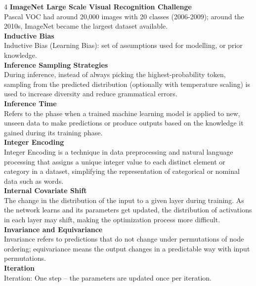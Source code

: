 \documentclass[8pt]{extarticle}
\begin{document}
\begin{multicols}{4}
\vspace{2pt}\textbf{ImageNet Large Scale Visual Recognition Challenge}\\
Pascal VOC had around 20,000 images with 20 classes (2006-2009); around the 2010s, ImageNet became the largest dataset available.\\
\vspace{2pt}\textbf{Inductive Bias}\\
Inductive Bias (Learning Bias): set of assumptions used for modelling, or prior knowledge.\\
\vspace{2pt}\textbf{Inference Sampling Strategies}\\
During inference, instead of always picking the highest-probability token, sampling from the predicted distribution (optionally with temperature scaling) is used to increase diversity and reduce grammatical errors.\\
\vspace{2pt}\textbf{Inference Time}\\
Refers to the phase when a trained machine learning model is applied to new, unseen data to make predictions or produce outputs based on the knowledge it gained during its training phase.\\
\vspace{2pt}\textbf{Integer Encoding}\\
Integer Encoding is a technique in data preprocessing and natural language processing that assigns a unique integer value to each distinct element or category in a dataset, simplifying the representation of categorical or nominal data such as words.\\
\vspace{2pt}\textbf{Internal Covariate Shift}\\
The change in the distribution of the input to a given layer during training. As the network learns and its parameters get updated, the distribution of activations in each layer may shift, making the optimization process more difficult.\\
\vspace{2pt}\textbf{Invariance and Equivariance}\\
Invariance refers to predictions that do not change under permutations of node ordering; equivariance means the output changes in a predictable way with input permutations.\\
\vspace{2pt}\textbf{Iteration}\\
Iteration: One step -- the parameters are updated once per iteration.\\

\end{multicols}
\end{document}
